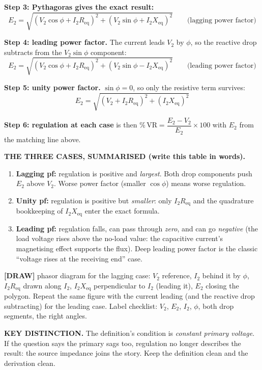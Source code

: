\documentclass[11pt]{article}
\newcommand{\tagline}[1]{\textbf{\color{copper}#1}}
\newcommand{\keydist}[1]{\vspace{2pt}\textbf{\color{red}KEY DISTINCTION.} #1}
\newcommand{\drawline}[1]{\textbf{\color{muted}[DRAW]} #1}
\begin{document}
\textbf{Step 3: Pythagoras gives the exact result:}
\[
E_2 = \sqrt{\left(V_2\cos\phi + I_2 R_{\text{eq}}\right)^{2} + \left(V_2\sin\phi + I_2 X_{\text{eq}}\right)^{2}}
\qquad\text{(lagging power factor)}
\]

\textbf{Step 4: leading power factor.} The current leads $V_2$ by $\phi$, so the reactive drop subtracts from the $V_2\sin\phi$ component:
\[
E_2 = \sqrt{\left(V_2\cos\phi + I_2 R_{\text{eq}}\right)^{2} + \left(V_2\sin\phi - I_2 X_{\text{eq}}\right)^{2}}
\qquad\text{(leading power factor)}
\]

\textbf{Step 5: unity power factor.} $\sin\phi = 0$, so only the resistive term survives:
\[
E_2 = \sqrt{\left(V_2 + I_2 R_{\text{eq}}\right)^{2} + \left(I_2 X_{\text{eq}}\right)^{2}}
\]

\textbf{Step 6: regulation at each case} is then $\%\,\text{VR} = \dfrac{E_2 - V_2}{E_2} \times 100$ with $E_2$ from the matching line above.

\tagline{THE THREE CASES, SUMMARISED (write this table in words).}
\begin{enumerate}[label=\arabic*.]
\item \textbf{Lagging pf:} regulation is positive and \emph{largest}. Both drop components push $E_2$ above $V_2$. Worse power factor (smaller $\cos\phi$) means worse regulation.
\item \textbf{Unity pf:} regulation is positive but \emph{smaller}: only $I_2 R_{\text{eq}}$ and the quadrature bookkeeping of $I_2 X_{\text{eq}}$ enter the exact formula.
\item \textbf{Leading pf:} regulation falls, can pass through \emph{zero}, and can go \emph{negative} (the load voltage rises above the no-load value: the capacitive current's magnetising effect supports the flux). Deep leading power factor is the classic ``voltage rises at the receiving end'' case.
\end{enumerate}

\drawline{phasor diagram for the lagging case: $V_2$ reference, $I_2$ behind it by $\phi$, $I_2 R_{\text{eq}}$ drawn along $I_2$, $I_2 X_{\text{eq}}$ perpendicular to $I_2$ (leading it), $E_2$ closing the polygon. Repeat the same figure with the current leading (and the reactive drop subtracting) for the leading case. Label checklist: $V_2$, $E_2$, $I_2$, $\phi$, both drop segments, the right angles.}

\keydist{The definition's condition is \emph{constant primary voltage}. If the question says the primary sags too, regulation no longer describes the result: the source impedance joins the story. Keep the definition clean and the derivation clean.}
\end{document}
